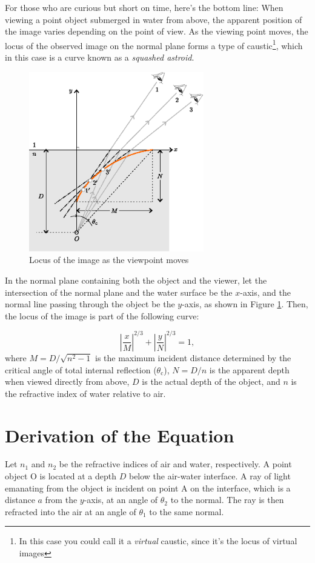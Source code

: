 \documentclass[twocolumn]{article}
\begin{document}
For those who are curious but short on time, here's the bottom line: When viewing a point object submerged in water from above, the apparent position of the image varies depending on the point of view. As the viewing point moves, the locus of the observed image on the normal plane forms a type of caustic\footnote{In this case you could call it a \emph{virtual} caustic, since it's the locus of virtual images}, which in this case is a curve known as a \emph{squashed astroid}.

\begin{figure}
	\centering
	\includegraphics[width=3in]{figs/g409.eps}
	\caption{Locus of the image as the viewpoint moves}
	\label{fig:caustic}
\end{figure}

In the normal plane containing both the object and the viewer, let the intersection of the normal plane and the water surface be the $x$-axis, and the normal line passing through the object be the $y$-axis, as shown in Figure \ref{fig:caustic}. Then, the locus of the image is part of the following curve:

$$ \left| \dfrac{x}{M} \right| ^ {2/3} + \left| \dfrac{y}{N} \right| ^ {2/3} = 1,$$
where $M = D/\sqrt{n^2 - 1}$ is the maximum incident distance determined by the critical angle of total internal reflection ($\theta_{\mathrm{c}}$), $N = D/n$ is the apparent depth when viewed directly from above, $D$ is the actual depth of the object, and $n$ is the refractive index of water relative to air.

\section{Derivation of the Equation}

Let $n_1$ and $n_2$ be the refractive indices of air and water, respectively. A point object $\mathrm{O}$ is located at a depth $D$ below the air-water interface. A ray of light emanating from the object is incident on point $\mathrm{A}$ on the interface, which is a distance $a$ from the $y$-axis, at an angle of $\theta_2$ to the normal. The ray is then refracted into the air at an angle of $\theta_1$ to the same normal.
\end{document}
